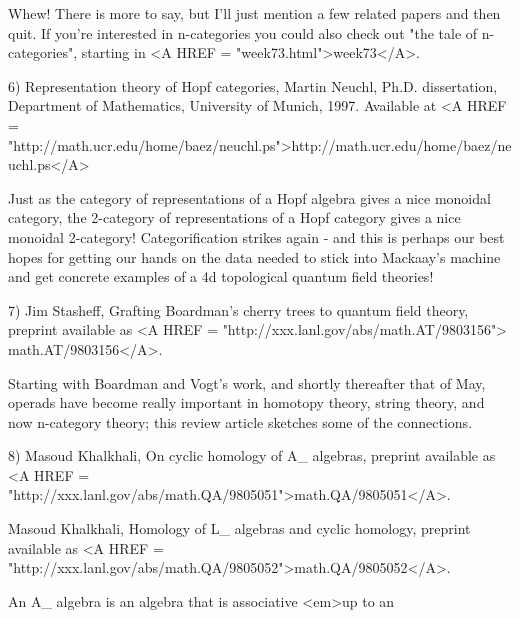 Whew!  There is more to say, but I'll just mention a few related
papers and then quit.  If you're interested in n-categories you
could also check out "the tale of n-categories", starting in 
<A HREF = "week73.html">week73</A>.

6) Representation theory of Hopf categories, Martin Neuchl, Ph.D.
dissertation, Department of Mathematics, University of Munich,
1997.   Available at <A HREF = "http://math.ucr.edu/home/baez/neuchl.ps">http://math.ucr.edu/home/baez/neuchl.ps</A>

Just as the category of representations of a Hopf algebra gives a nice
monoidal category, the 2-category of representations of a Hopf category
gives a nice monoidal 2-category!  Categorification strikes again - and
this is perhaps our best hopes for getting our hands on the data needed
to stick into Mackaay's machine and get concrete examples of a 4d topological
quantum field theories!

7) Jim Stasheff, Grafting Boardman's cherry trees to quantum field theory,
preprint available as <A HREF = "http://xxx.lanl.gov/abs/math.AT/9803156">
math.AT/9803156</A>.


Starting with Boardman and Vogt's work, and shortly thereafter that of
May, operads have become really important in homotopy theory, string
theory, and now n-category theory; this review article sketches some 
of the connections.

8) Masoud Khalkhali, On cyclic homology of A_{\infty } 
algebras, preprint 
available 
as <A HREF = "http://xxx.lanl.gov/abs/math.QA/9805051">math.QA/9805051</A>.
 
Masoud Khalkhali, Homology of L_{\infty } algebras and cyclic homology,
preprint available 
as <A HREF = "http://xxx.lanl.gov/abs/math.QA/9805052">math.QA/9805052</A>.

An A_{\infty } algebra is an algebra that is associative <em>up to an


